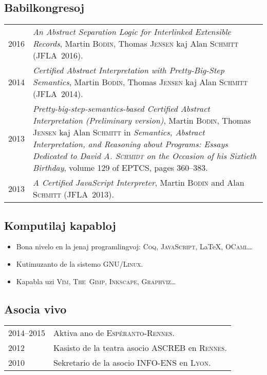 \documentclass[12pt,a4paper]{article}
\makeatletter
\newenvironment{datecvsection}[1]%
               {\subsection*{#1}%
                 \noindent \begin{tabular}{@{}p{\annee}p{\texte}@{}}}
               {\end{tabular}}
\newenvironment{itemcvsection}[1]%
               {\subsection*{#1}\begin{itemize}}
               {\end{itemize}}
\makeatother
\begin{document}
\begin{datecvsection}{Babilkongresoj}

  2016 & \textit{An Abstract Separation Logic for Interlinked Extensible Records}, Martin \textsc{Bodin}, Thomas \textsc{Jensen} kaj Alan \textsc{Schmitt} (JFLA~2016). \\

  2014 & \textit{Certified Abstract Interpretation with Pretty-Big-Step Semantics}, Martin \textsc{Bodin}, Thomas \textsc{Jensen} kaj Alan \textsc{Schmitt} (JFLA~2014). \\

  2013 & \textit{Pretty-big-step-semantics-based Certified Abstract Interpretation (Preliminary version)}, Martin \textsc{Bodin}, Thomas \textsc{Jensen} kaj Alan \textsc{Schmitt} in \textit{Semantics, Abstract Interpretation, and Reasoning about Programs: Essays Dedicated to David A. \textsc{Schmidt} on the Occasion of his Sixtieth Birthday}, volume 129 of EPTCS, pages 360–383. \\

  2013 & \textit{A Certified JavaScript Interpreter}, Martin \textsc{Bodin} and Alan \textsc{Schmitt} (JFLA~2013). \\

\end{datecvsection}

\begin{itemcvsection}{Komputilaj kapabloj}

  \item Bona nivelo en la jenaj programlingvoj:  \textsc{Coq}, \textsc{JavaScript}, \LaTeX, \textsc{OCaml}\ldots
  \item Kutimuzanto de la sistemo \textsc{GNU/Linux}.
  \item Kapabla uzi \textsc{Vim}, \textsc{The~Gimp}, \textsc{Inkscape}, \textsc{Graphviz}…

\end{itemcvsection}

\begin{datecvsection}{Asocia vivo}

    2014–2015 & Aktiva ano de \textsc{Espéranto-Rennes}. \\
	2012 & Kasisto de la teatra asocio \textsc{ASCREB} en \textsc{Rennes}. \\
	2010 & Sekretario de la asocio \textsc{INFO-ENS} en \textsc{Lyon}.

\end{datecvsection}
\end{document}
